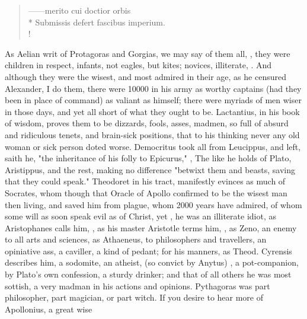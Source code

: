 \begin{latin}
\begin{verse}%
------merito cui doctior orbis\\*
Submissis defert fascibus imperium.\\!
\end{verse}%
\end{latin}

As Aelian writ of Protagoras and Gorgias, we may say of them all, , they were children in respect,
infants, not eagles, but kites; novices, illiterate, .
And although they were the wisest, and most admired in their age, as he
censured Alexander, I do them, there were 10\thinspace{}000 in his army as
worthy captains (had they been in place of command) as valiant as himself;
there were myriads of men wiser in those days, and yet all short of what they
ought to be. Lactantius, in his book of wisdom, proves them
to be dizzards, fools, asses, madmen, so full of absurd and ridiculous tenets,
and brain-sick positions, that to his thinking never any old woman or sick
person doted worse. Democritus took all from Leucippus, and
left, saith he, "the inheritance of his folly to Epicurus,"
, \etc{} The like he holds of
Plato, Aristippus, and the rest, making no difference
"betwixt them and beasts, saving that they could speak."
Theodoret in his tract,  manifestly evinces as much of Socrates, whom though that Oracle of
Apollo confirmed to be the wisest man then living, and saved him from plague,
whom 2000 years have admired, of whom some will as soon speak evil as of
Christ, yet , he was an illiterate idiot, as
Aristophanes calls him, , as his
master Aristotle terms him, , as Zeno, an
enemy to all arts and sciences, as Athaeneus, to
philosophers and travellers, an opiniative ass, a caviller, a kind of pedant;
for his manners, as Theod. Cyrensis describes him, a
sodomite, an atheist, (so convict by Anytus) , \etc{} a pot-companion, by Plato's own
confession, a sturdy drinker; and that of all others he was most sottish, a
very madman in his actions and opinions. Pythagoras was part philosopher, part
magician, or part witch. If you desire to hear more of Apollonius, a great wise

